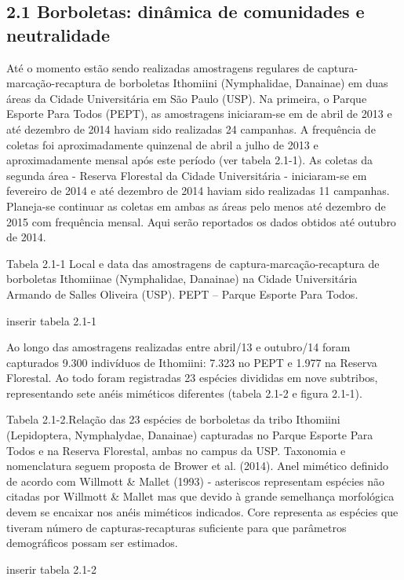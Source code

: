 \subsection{2.1 Borboletas: dinâmica de comunidades e neutralidade} %
\label{sec:dinamica-temporal-borb} 
Até o momento estão sendo realizadas amostragens regulares de captura-marcação-recaptura de borboletas Ithomiini (Nymphalidae, Danainae) em duas áreas da Cidade Universitária em São Paulo (USP). Na primeira, o Parque Esporte Para Todos (PEPT), as amostragens iniciaram-se em de abril de 2013 e até dezembro de 2014 haviam sido realizadas 24 campanhas. A frequência de coletas foi aproximadamente quinzenal de abril a julho de 2013 e aproximadamente mensal após este período (ver tabela 2.1-1). As coletas da segunda área - Reserva Florestal da Cidade Universitária - iniciaram-se em fevereiro de 2014 e até dezembro de 2014 haviam sido realizadas 11 campanhas. Planeja-se continuar as coletas em ambas as áreas pelo menos até dezembro de 2015 com frequência mensal. Aqui serão reportados os dados obtidos até outubro de 2014.

Tabela 2.1-1 Local e data das amostragens de captura-marcação-recaptura de borboletas Ithomiinae (Nymphalidae, Danainae) na Cidade Universitária Armando de Salles Oliveira (USP). PEPT – Parque Esporte Para Todos.

inserir tabela 2.1-1

Ao longo das amostragens realizadas entre abril/13 e outubro/14 foram capturados 9.300 indivíduos de Ithomiini: 7.323 no PEPT e 1.977 na Reserva Florestal. Ao todo foram registradas 23 espécies divididas em nove subtribos, representando sete anéis miméticos diferentes (tabela 2.1-2 e figura 2.1-1). 

Tabela 2.1-2.Relação das 23 espécies de borboletas da tribo Ithomiini (Lepidoptera, Nymphalydae, Danainae) capturadas no Parque Esporte Para Todos e na Reserva Florestal, ambas no campus da USP. Taxonomia e nomenclatura seguem proposta de Brower et al. (2014). Anel mimético definido de acordo com Willmott & Mallet (1993) - asteriscos representam espécies não citadas por Willmott & Mallet mas que devido à grande semelhança morfológica devem se encaixar nos anéis miméticos indicados. Core representa as espécies que tiveram número de capturas-recapturas suficiente para que parâmetros demográficos possam ser estimados.

inserir tabela 2.1-2